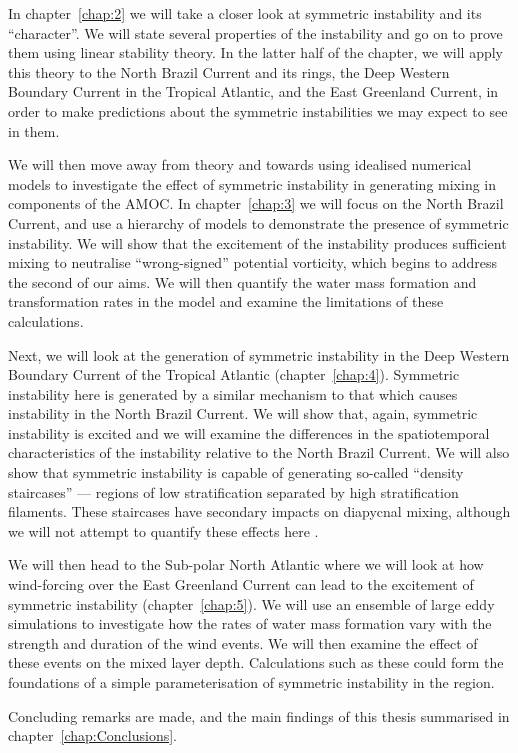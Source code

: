 In chapter~\ref{chap:2} we will take a closer look at symmetric instability and its ``character''. We will state several properties of the instability and go on to prove them using linear stability theory. In the latter half of the chapter, we will apply this theory to the North Brazil Current and its rings, the Deep Western Boundary Current in the Tropical Atlantic, and the East Greenland Current, in order to make predictions about the symmetric instabilities we may expect to see in them.

We will then move away from theory and towards using idealised numerical models to investigate the effect of symmetric instability in generating mixing in components of the AMOC. In chapter~\ref{chap:3} we will focus on the North Brazil Current, and use a hierarchy of models to demonstrate the presence of symmetric instability. We will show that the excitement of the instability produces sufficient mixing to neutralise ``wrong-signed'' potential vorticity, which begins to address the second of our aims. We will then quantify the water mass formation and transformation rates in the model and examine the limitations of these calculations.

Next, we will look at the generation of symmetric instability in the Deep Western Boundary Current of the Tropical Atlantic (chapter~\ref{chap:4}). Symmetric instability here is generated by a similar mechanism to that which causes instability in the North Brazil Current. We will show that, again, symmetric instability is excited and we will examine the differences in the spatiotemporal characteristics of the instability relative to the North Brazil Current. We will also show that symmetric instability is capable of generating so-called ``density staircases'' --- regions of low stratification separated by high stratification filaments. These staircases have secondary impacts on diapycnal mixing, although we will not attempt to quantify these effects here \citep{Schmitt2005}.

We will then head to the Sub-polar North Atlantic where we will look at how wind-forcing over the East Greenland Current can lead to the excitement of symmetric instability (chapter~\ref{chap:5}). We will use an ensemble of large eddy simulations to investigate how the rates of water mass formation vary with the strength and duration of the wind events. We will then examine the effect of these events on the mixed layer depth. Calculations such as these could form the foundations of a simple parameterisation of symmetric instability in the region.

Concluding remarks are made, and the main findings of this thesis summarised in chapter~\ref{chap:Conclusions}.
